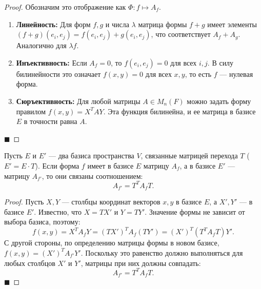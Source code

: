 \begin{proof}
Обозначим это отображение как $\Phi: f \mapsto A_f$.
\begin{enumerate}
    \item \textbf{Линейность:} Для форм $f, g$ и числа $\lambda$ матрица формы $f+g$ имеет элементы $(f+g)(e_i, e_j) = f(e_i, e_j) + g(e_i, e_j)$, что соответствует $A_f + A_g$. Аналогично для $\lambda f$.
    \item \textbf{Инъективность:} Если $A_f = 0$, то $f(e_i, e_j) = 0$ для всех $i, j$. В силу билинейности это означает $f(x, y) = 0$ для всех $x, y$, то есть $f$ --- нулевая форма.
    \item \textbf{Сюръективность:} Для любой матрицы $A \in M_n(F)$ можно задать форму правилом $f(x, y) = X^T A Y$. Эта функция билинейна, и ее матрица в базисе $E$ в точности равна $A$.
\end{enumerate}
\hfill$\blacksquare$
\end{proof}

\begin{theorem}
Пусть $E$ и $E'$ --- два базиса пространства $V$, связанные матрицей перехода $T$ ($E' = E \cdot T$). Если форма $f$ имеет в базисе $E$ матрицу $A_f$, а в базисе $E'$ --- матрицу $A_{f'}$, то они связаны соотношением:
\[
A_{f'} = T^T A_f T.
\]
\end{theorem}

\begin{proof}
Пусть $X, Y$ --- столбцы координат векторов $x, y$ в базисе $E$, а $X', Y'$ --- в базисе $E'$. Известно, что $X = T X'$ и $Y = T Y'$.
Значение формы не зависит от выбора базиса, поэтому:
\[
f(x, y) = X^T A_f Y = (T X')^T A_f (T Y') = (X')^T (T^T A_f T) Y'.
\]
С другой стороны, по определению матрицы формы в новом базисе, $f(x, y) = (X')^T A_{f'} Y'$. 
Поскольку это равенство должно выполняться для любых столбцов $X'$ и $Y'$, матрицы при них должны совпадать:
\[
A_{f'} = T^T A_f T.
\]
\hfill$\blacksquare$
\end{proof}

